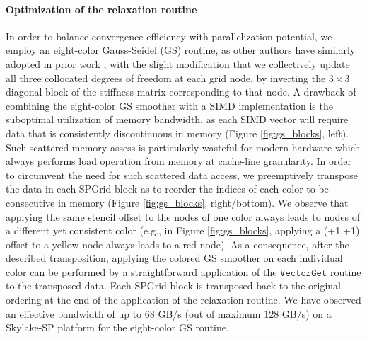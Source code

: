 \paragraph{Optimization of the relaxation routine} In order to balance convergence efficiency with parallelization potential, we employ an eight-color Gauss-Seidel (GS) routine, as other
authors have similarly adopted in prior work \cite{wu2016}, with the slight modification that we collectively update all three collocated degrees of freedom at each grid node, by inverting
the $3\times 3$ diagonal block of the stiffness matrix corresponding to that node. A drawback of combining the eight-color GS smoother with a SIMD implementation is the suboptimal
utilization of memory bandwidth, as each SIMD vector will require data that is consistently discontinuous in memory (Figure \ref{fig:gs_blocks}, left). Such scattered memory assess is
particularly wasteful for modern hardware which always performs load operation from memory at cache-line granularity. In order to circumvent the need for such scattered data access, we
preemptively transpose the data in each SPGrid block as to reorder the indices of each color to be consecutive in memory (Figure \ref{fig:gs_blocks}, right/bottom). We observe that applying the
same stencil offset to the nodes of one color always leads to nodes of a different yet consistent color (e.g., in Figure \ref{fig:gs_blocks}, applying a (+1,+1) offset to a yellow node
always leads to a red node). As a consequence, after the described transposition, applying the colored GS smoother on each individual color can be performed by a straightforward
application of the $\texttt{VectorGet}$ routine to the transposed data. Each SPGrid block is transposed back to the original ordering at the end of the application of the
relaxation routine. We have observed an effective bandwidth of up to $68$ GB/s (out of maximum $128$ GB/s) on a Skylake-SP platform for the eight-color GS routine.


